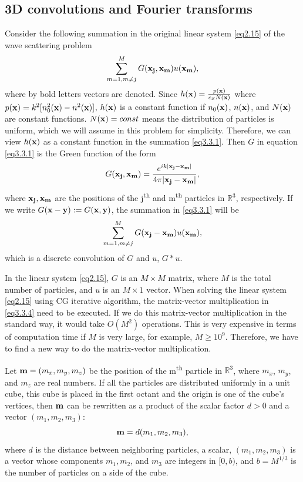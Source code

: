 \documentclass[12pt]{elsarticle}
\numberwithin{equation}{section}
\newcommand{\be}{\begin{equation}}
\newcommand{\ee}{\end{equation}}
\newcommand{\RRR}{\mathbb{R}^3}
\begin{document}
\subsection{3D convolutions and Fourier transforms} \label{sec3.3}
Consider the following summation in the original linear system \eqref{eq2.15} of the wave scattering problem
\be \label{eq3.3.1}
	\sum_{m=1, m \ne j}^M G(\bold{x_j},\bold{x_m})u(\bold{x_m}),
\ee
where by bold letters vectors are denoted.
Since $h(\bold{x})=\frac{p(\bold{x})}{c_SN(\bold{x})}$ where $p(\bold{x})=k^2[n_0^2(\bold{x})-n^2(\bold{x})]$, $h(\bold{x})$ is a constant function if $n_0(\bold{x})$, $n(\bold{x})$, and $N(\bold{x})$ are constant functions. $N(\bold{x})= const$ means the distribution of particles is uniform, which we will assume in this problem for simplicity. Therefore, we can view $h(\bold{x})$ as a constant function in the summation \eqref{eq3.3.1}.  Then $G$ in equation \eqref{eq3.3.1} is the Green function of the form
\be \label{eq3.3.2}
	G(\bold{x_j},\bold{x_m})=\frac{e^{ik|\bold{x_j}-\bold{x_m}|}}{4\pi|\bold{x_j}-\bold{x_m}|},
\ee
where $\bold{x_j}, \bold{x_m}$ are the positions of the j\textsuperscript{th} and m\textsuperscript{th} particles in $\RRR$, respectively. If we write $G(\bold{x}-\bold{y}):=G(\bold{x},\bold{y})$, the summation in \eqref{eq3.3.1} will be
\be \label{eq3.3.4}
	\sum_{m=1, m \ne j}^M G(\bold{x_j}-\bold{x_m})u(\bold{x_m}),
\ee
which is a discrete convolution of $G$ and $u$, $G*u$.

In the linear system \eqref{eq2.15}, $G$ is an $M\times M$ matrix, where $M$ is the total number of particles, and $u$ is an $M \times 1$ vector. When solving the linear system \eqref{eq2.15} using CG iterative algorithm, the matrix-vector multiplication in \eqref{eq3.3.4} need to be executed. If we do this matrix-vector multiplication in the standard way, it would take $O(M^2)$ operations. This is very expensive in terms of computation time if $M$ is very large, for example,  $M \ge 10^{9}$. Therefore, we have to find a new way to do the matrix-vector multiplication.

Let $\bold{m}=(m_x,m_y,m_z)$ be the position of the m\textsuperscript{th} particle in $\RRR$, where $m_x$, $m_y$, and $m_z$ are real
numbers. If all the particles are distributed uniformly in a unit cube,  this cube is placed in the first octant and the origin is one of the cube's vertices, then $\bold{m}$ can be rewritten as a product of the scalar factor $d>0$ and a vector $(m_1, m_2, m_3)$:
\be \label{eq3.3.5}
	\bold{m}=d(m_1,m_2,m_3),
\ee
where $d$ is the distance between neighboring particles, a scalar,  $(m_1,m_2,m_3)$ is a vector whose components $m_1, m_2$, and $m_3$ are integers in $[0,b)$, and $b=M^{1/3}$ is the number of particles on a side of the cube.
\end{document}
